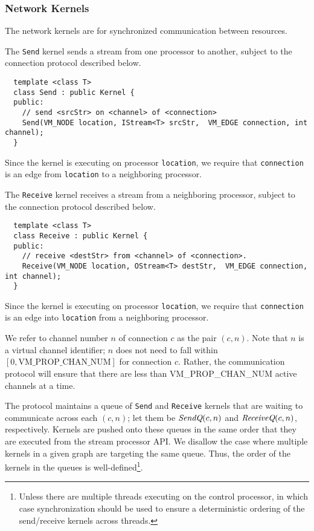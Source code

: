 \subsubsection*{Network Kernels}

The network kernels are for synchronized communication between
resources.

 The {\tt Send} kernel sends a stream from one processor to
another, subject to the connection protocol described below.
{\small
\begin{verbatim}
  template <class T>
  class Send : public Kernel {
  public:
    // send <srcStr> on <channel> of <connection>
    Send(VM_NODE location, IStream<T> srcStr,  VM_EDGE connection, int channel);
  }
\end{verbatim}}
Since the kernel is executing on processor {\tt location}, we require
that {\tt connection} is an edge from {\tt location} to a neighboring
processor.

 The {\tt Receive} kernel receives a stream from a
neighboring processor, subject to the connection protocol described
below.  
{\small
\begin{verbatim}
  template <class T>
  class Receive : public Kernel {
  public:
    // receive <destStr> from <channel> of <connection>.
    Receive(VM_NODE location, OStream<T> destStr,  VM_EDGE connection, int channel);
  }  
\end{verbatim}}
Since the kernel is executing on processor {\tt location}, we require
that {\tt connection} is an edge into {\tt location} from a
neighboring processor.

 We refer to channel number $n$ of
connection $c$ as the pair $(c, n)$.  Note that $n$ is a virtual
channel identifier; $n$ does not need to fall within $[0,
\mbox{VM\_PROP\_CHAN\_NUM}]$ for connection $c$.  Rather, the
communication protocol will ensure that there are less than
VM\_PROP\_CHAN\_NUM active channels at a time.

The protocol maintains a queue of {\tt Send} and {\tt Receive} kernels
that are waiting to communicate across each $(c, n)$; let them be
$\mbox{\it SendQ}(c, n)$ and $\mbox{\it ReceiveQ}(c, n)$, respectively.  Kernels
are pushed onto these queues in the same order that they are executed
from the stream processor API.  We disallow the case where multiple
kernels in a given graph are targeting the same queue.  Thus, the
order of the kernels in the queues is well-defined\footnote{Unless
there are multiple threads executing on the control processor, in
which case synchronization should be used to ensure a deterministic
ordering of the send/receive kernels across threads.}.


